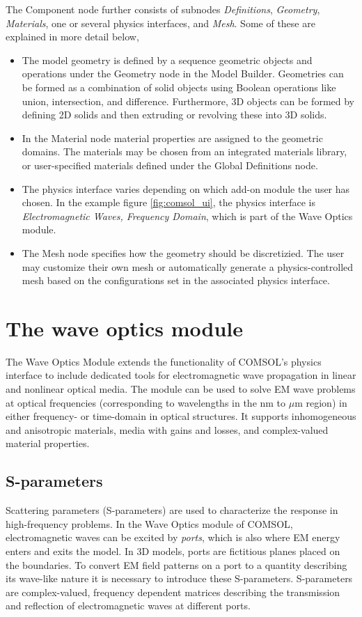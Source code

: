The Component node further consists of subnodes \emph{Definitions}, \emph{Geometry}, \emph{Materials}, one or several physics interfaces, and \emph{Mesh}. Some of these are explained in more detail below,
\begin{itemize}
    \item The model geometry is defined by a sequence geometric objects and operations under the Geometry node in the Model Builder. Geometries can be formed as a combination of solid objects using Boolean operations like union, intersection, and difference. Furthermore, 3D objects can be formed by defining 2D solids and then extruding or revolving these into 3D solids.
    \item In the Material node material properties are assigned to the geometric domains. The materials may be chosen from an integrated materials library, or user-specified materials defined under the Global Definitions node.
    \item The physics interface varies depending on which add-on module the user has chosen. In the example figure \ref{fig:comsol_ui}, the physics interface is \emph{Electromagnetic Waves, Frequency Domain}, which is part of the Wave Optics module.
    \item The Mesh node specifies how the geometry should be discretizied. The user may customize their own mesh or automatically generate a physics-controlled mesh based on the configurations set in the associated physics interface.
\end{itemize}

\section{The wave optics module}
The Wave Optics Module extends the functionality of COMSOL's physics interface to include dedicated tools for electromagnetic wave propagation in linear and nonlinear optical media. The module can be used to 
solve EM wave problems at optical frequencies (corresponding to wavelengths in the nm to $\mu$m region) in either frequency- or time-domain in optical structures. It supports inhomogeneous and anisotropic materials, media with gains and losses, and complex-valued material properties. 



\subsection{S-parameters}
Scattering parameters (S-parameters) are used to characterize the response in high-frequency problems.
In the Wave Optics module of COMSOL, electromagnetic waves can be excited by \emph{ports}, which is also where EM energy enters and exits the model. In 3D models, ports are fictitious planes placed on the boundaries. To convert EM field patterns on a port to a quantity describing its wave-like nature it is necessary to introduce these S-parameters. S-parameters are complex-valued, frequency dependent matrices describing the transmission and reflection of electromagnetic waves at different ports. 


